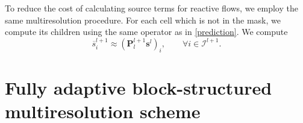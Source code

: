 \documentclass[]{article}
\begin{document}
        To reduce the cost of calculating source terms for reactive flows, we employ
        the same multiresolution procedure. For each cell which is not in the mask,
        we compute its children using the same operator as in \ref{prediction}.
        We compute
        \begin{equation}
            \overline{s}_{i}^{l+1} \approx \left( \bm{P}_{l}^{l+1} \bm{s}^{l}
                \right)_{i}, \text{ } \text{ } \text{ } \forall i \in
                \bm{\mathcal{I}}^{l+1}.
        \end{equation}

\section{Fully adaptive block-structured multiresolution scheme}

\end{document}
